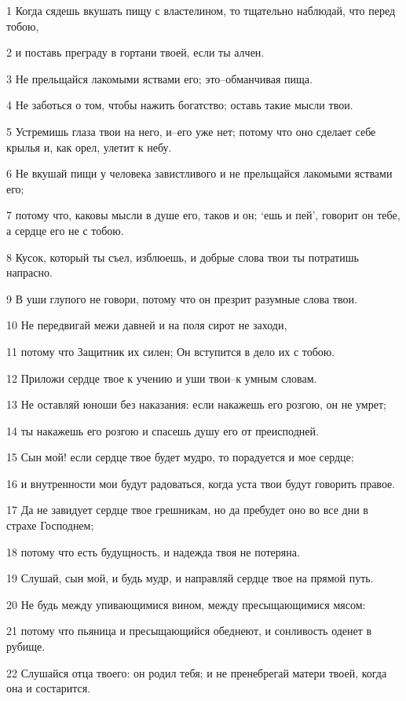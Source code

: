 \par 1 Когда сядешь вкушать пищу с властелином, то тщательно наблюдай, что перед тобою,
\par 2 и поставь преграду в гортани твоей, если ты алчен.
\par 3 Не прельщайся лакомыми яствами его; это--обманчивая пища.
\par 4 Не заботься о том, чтобы нажить богатство; оставь такие мысли твои.
\par 5 Устремишь глаза твои на него, и--его уже нет; потому что оно сделает себе крылья и, как орел, улетит к небу.
\par 6 Не вкушай пищи у человека завистливого и не прельщайся лакомыми яствами его;
\par 7 потому что, каковы мысли в душе его, таков и он; `ешь и пей', говорит он тебе, а сердце его не с тобою.
\par 8 Кусок, который ты съел, изблюешь, и добрые слова твои ты потратишь напрасно.
\par 9 В уши глупого не говори, потому что он презрит разумные слова твои.
\par 10 Не передвигай межи давней и на поля сирот не заходи,
\par 11 потому что Защитник их силен; Он вступится в дело их с тобою.
\par 12 Приложи сердце твое к учению и уши твои--к умным словам.
\par 13 Не оставляй юноши без наказания: если накажешь его розгою, он не умрет;
\par 14 ты накажешь его розгою и спасешь душу его от преисподней.
\par 15 Сын мой! если сердце твое будет мудро, то порадуется и мое сердце;
\par 16 и внутренности мои будут радоваться, когда уста твои будут говорить правое.
\par 17 Да не завидует сердце твое грешникам, но да пребудет оно во все дни в страхе Господнем;
\par 18 потому что есть будущность, и надежда твоя не потеряна.
\par 19 Слушай, сын мой, и будь мудр, и направляй сердце твое на прямой путь.
\par 20 Не будь между упивающимися вином, между пресыщающимися мясом:
\par 21 потому что пьяница и пресыщающийся обеднеют, и сонливость оденет в рубище.
\par 22 Слушайся отца твоего: он родил тебя; и не пренебрегай матери твоей, когда она и состарится.
